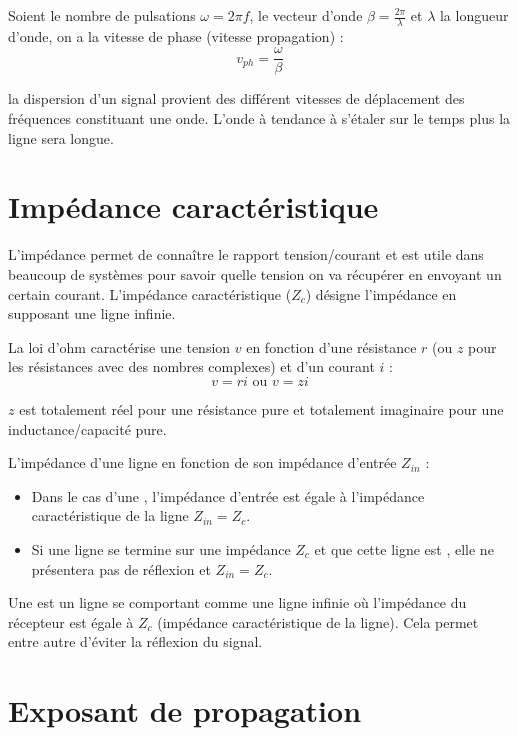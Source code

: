 Soient le nombre de pulsations $\omega = 2 \pi f$, le vecteur d'onde $\beta = \frac{2 \pi}{\lambda}$ et $\lambda$ la longueur d'onde, on a la vitesse de phase (vitesse propagation) :
\begin{equation*}
v_{ph} = \frac{\omega}{\beta}
\end{equation*}

la dispersion d'un signal provient des différent vitesses de déplacement des fréquences constituant une onde. L'onde à tendance à s'étaler sur le temps plus la ligne sera longue.

\section{Impédance caractéristique}

L'impédance permet de connaître le rapport tension/courant et est utile dans beaucoup de systèmes pour savoir quelle tension on va récupérer en envoyant un certain courant. L'impédance caractéristique ($Z_c$) désigne l'impédance en supposant une ligne infinie.

La loi d'ohm caractérise une tension $v$ en fonction d'une résistance $r$ (ou $z$ pour les résistances avec des nombres complexes) et d'un courant $i$ :
\begin{equation*}
v = ri \text{ ou } v = zi
\end{equation*}

$z$ est totalement réel pour une résistance pure et totalement imaginaire pour une inductance/capacité pure.

L'impédance d’une ligne en fonction de son impédance d’entrée $Z_{in}$ :
\begin{itemize}
\item Dans le cas d'une , l'impédance d'entrée est égale à l'impédance caractéristique de la ligne $Z_{in} = Z_c$.
\item Si une ligne se termine sur une impédance $Z_c$ et que cette ligne est , elle ne présentera pas de réflexion et $Z_{in} = Z_c$.
\end{itemize}

Une  est un ligne se comportant comme une ligne infinie où l'impédance du récepteur est égale à $Z_c$ (impédance caractéristique de la ligne). Cela permet entre autre d'éviter la réflexion du signal.

\section{Exposant de propagation}

